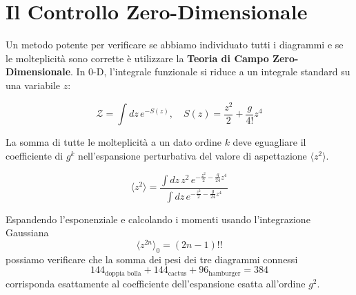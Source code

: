 \section{Il Controllo Zero-Dimensionale}

Un metodo potente per verificare se abbiamo individuato tutti i diagrammi e se le molteplicità sono corrette è utilizzare la \textbf{Teoria di Campo Zero-Dimensionale}.
In 0-D, l'integrale funzionale si riduce a un integrale standard su una variabile $z$:

\begin{equation}
    \mathcal{Z} = \int dz \, e^{-S(z)}, \quad S(z) = \frac{z^2}{2} + \frac{g}{4!} z^4
\end{equation}

\noindent La somma di tutte le molteplicità a un dato ordine $k$ deve eguagliare il coefficiente di $g^k$ nell'espansione perturbativa del valore di aspettazione $\langle z^2 \rangle$.

\begin{equation}
    \langle z^2 \rangle = \frac{\int dz \, z^2 \, e^{-\frac{z^2}{2} - \frac{g}{24}z^4}}{\int dz \, e^{-\frac{z^2}{2} - \frac{g}{24}z^4}}
\end{equation}

\noindent Espandendo l'esponenziale e calcolando i momenti usando l'integrazione Gaussiana
\begin{equation}
    \langle z^{2n} \rangle_0 = (2n-1)!!
\end{equation}
possiamo verificare che la somma dei pesi dei tre diagrammi connessi 
\begin{equation}
    144_{\text{doppia bolla}} + 144_{\text{cactus}} + 96_{\text{hamburger}} = 384
\end{equation}
corrisponda esattamente al coefficiente dell'espansione esatta all'ordine $g^2$.
